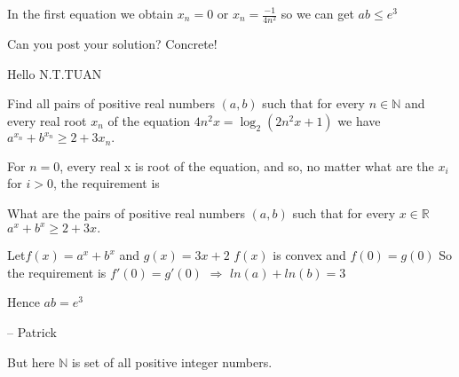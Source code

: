 \begin{mysolution}
	In the first equation we obtain $x_{n}=0$ or $x_{n}=\frac{-1}{4n^{2}}$
so we can get $ab \leq e^{3}$
\end{mysolution}



\begin{mysolution}
	Can you post your solution? Concrete!
\end{mysolution}



\begin{mysolution}
	Hello N.T.TUAN
\begin{tcolorbox}Find all pairs of positive real numbers $(a, b)$ such that for every $n \in\mathbb{N}$ and every real root $x_{n}$ of the equation $4n^{2}x = \log_{2}(2n^{2}x+1)$ we have $a^{x_{n}}+b^{x_{n}}\geq 2+3x_{n}.$\end{tcolorbox}

For $n=0$, every real x is root of the equation, and so, no matter what are the $x_{i}$ for $i>0$, the requirement is

What are the pairs of positive real numbers $(a, b)$ such that for every $x \in \mathbb{R}$ $a^{x}+b^{x}\geq 2+3x.$

Let$f(x)=a^{x}+b^{x}$ and $g(x)=3x+2$
$f(x)$ is convex and  $f(0) = g(0)$
So the requirement is $f'(0)=g'(0)$ $\Rightarrow $ $ln(a)+ln(b)=3$

Hence $ab=e^{3}$

-- 
Patrick
\end{mysolution}



\begin{mysolution}
	But here $\mathbb{N}$ is set of all positive integer numbers.
\end{mysolution}



